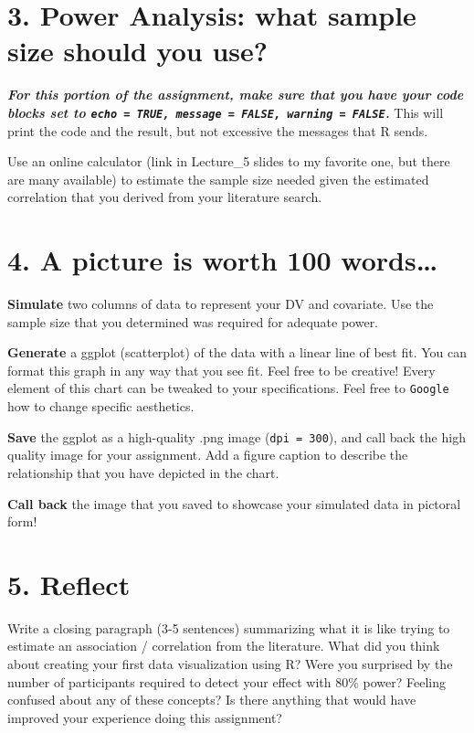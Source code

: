 \documentclass[
]{book}
\begin{document}
\section*{3. Power Analysis: what sample size should you use?}\label{power-analysis-what-sample-size-should-you-use}

\textbf{\emph{For this portion of the assignment, make sure that you have your code blocks set to \texttt{echo\ =\ TRUE,\ message\ =\ FALSE,\ warning\ =\ FALSE}.}} This will print the code and the result, but not excessive the messages that R sends.

Use an online calculator (link in Lecture\_5 slides to my favorite one, but there are many available) to estimate the sample size needed given the estimated correlation that you derived from your literature search.

\section*{4. A picture is worth 100 words\ldots{}}\label{a-picture-is-worth-100-words}

\textbf{Simulate} two columns of data to represent your DV and covariate. Use the sample size that you determined was required for adequate power.

\textbf{Generate} a ggplot (scatterplot) of the data with a linear line of best fit. You can format this graph in any way that you see fit. Feel free to be creative! Every element of this chart can be tweaked to your specifications. Feel free to \texttt{Google} how to change specific aesthetics.

\textbf{Save} the ggplot as a high-quality .png image (\texttt{dpi\ =\ 300}), and call back the high quality image for your assignment. Add a figure caption to describe the relationship that you have depicted in the chart.

\textbf{Call back} the image that you saved to showcase your simulated data in pictoral form!

\section*{5. Reflect}\label{reflect-3}

Write a closing paragraph (3-5 sentences) summarizing what it is like trying to estimate an association / correlation from the literature. What did you think about creating your first data visualization using R? Were you surprised by the number of participants required to detect your effect with 80\% power? Feeling confused about any of these concepts? Is there anything that would have improved your experience doing this assignment?
\end{document}
